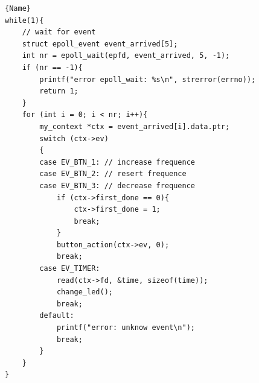 \documentclass[
	a4paper, %
	10pt, %
]{CSUniSchoolLabReport}
\begin{document}
\begin{lstlisting}[style=CStyle, caption=Boucle principale, firstnumber=1]{Name}
while(1){
	// wait for event
	struct epoll_event event_arrived[5];
	int nr = epoll_wait(epfd, event_arrived, 5, -1);
	if (nr == -1){
		printf("error epoll_wait: %s\n", strerror(errno));
		return 1;
	}
	for (int i = 0; i < nr; i++){
		my_context *ctx = event_arrived[i].data.ptr;
		switch (ctx->ev)
		{
		case EV_BTN_1: // increase frequence
		case EV_BTN_2: // resert frequence
		case EV_BTN_3: // decrease frequence
			if (ctx->first_done == 0){
				ctx->first_done = 1;
				break;
			}
			button_action(ctx->ev, 0);
			break;
		case EV_TIMER:
			read(ctx->fd, &time, sizeof(time));
			change_led();
			break;
		default:
			printf("error: unknow event\n");
			break;
		}
	}
}
\end{lstlisting}
\end{document}
